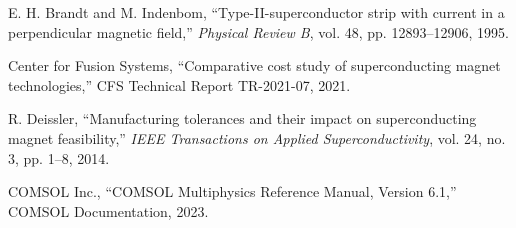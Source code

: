 \documentclass[10pt,twocolumn]{article}
\begin{document}
\begin{thebibliography}{8}
E. H. Brandt and M. Indenbom, ``Type-II-superconductor strip with current in a perpendicular magnetic field,'' \textit{Physical Review B}, vol. 48, pp. 12893--12906, 1995.

Center for Fusion Systems, ``Comparative cost study of superconducting magnet technologies,'' CFS Technical Report TR-2021-07, 2021.

R. Deissler, ``Manufacturing tolerances and their impact on superconducting magnet feasibility,'' \textit{IEEE Transactions on Applied Superconductivity}, vol. 24, no. 3, pp. 1--8, 2014.

COMSOL Inc., ``COMSOL Multiphysics Reference Manual, Version 6.1,'' COMSOL Documentation, 2023.

\end{thebibliography}
\end{document}
